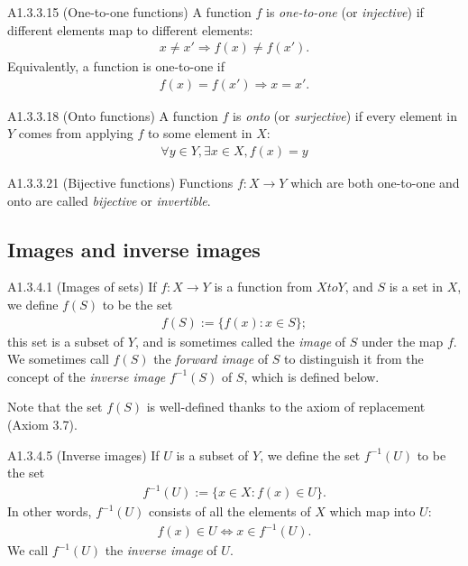 \begin{definition}{A1.3.3.15}
    (One-to-one functions) A function $f$ is \emph{one-to-one} (or \emph{injective}) if different elements map to
    different elements:
    \begin{align*}
        x\neq x' \Rightarrow f(x)\neq f(x').
    \end{align*}
    Equivalently, a function is one-to-one if
    \begin{align*}
        f(x)=f(x') \Rightarrow x=x'.
    \end{align*}
\end{definition}

\begin{definition}{A1.3.3.18}
    (Onto functions) A function $f$ is \emph{onto} (or \emph{surjective}) if every element in $Y$ comes from applying
    $f$ to some element in $X$:
    \begin{align*}
        \forall y\in Y, \exists x\in X, f(x)=y
    \end{align*}
\end{definition}

\begin{definition}{A1.3.3.21}
    (Bijective functions) Functions $f: X\rightarrow Y$ which are both one-to-one and onto are called \emph{bijective}
    or \emph{invertible}.
\end{definition}

\subsection{Images and inverse images}
\begin{definition}{A1.3.4.1}
    (Images of sets) If $f: X\rightarrow Y$ is a function from $X to Y$, and $S$ is a set in $X$, we define $f(S)$ to be
    the set
    \begin{align*}
        f(S) := \{f(x):x\in S\};
    \end{align*}
    this set is a subset of $Y$, and is sometimes called the \emph{image} of $S$ under the map $f$. We sometimes call
    $f(S)$ the \emph{forward image} of $S$ to distinguish it from the concept of the \emph{inverse image} $f^{-1}(S)$
    of $S$, which is defined below.

    Note that the set $f(S)$ is well-defined thanks to the axiom of replacement (Axiom 3.7).
\end{definition}

\begin{definition}{A1.3.4.5}
    (Inverse images) If $U$ is a subset of $Y$, we define the set $f^{-1}(U)$ to be the set
    \begin{align*}
        f^{-1}(U) := \{x\in X:f(x)\in U\}.
    \end{align*}
    In other words, $f^{-1}(U)$ consists of all the elements of $X$ which map into $U$:
    \begin{align*}
        f(x)\in U \iff x\in f^{-1}(U).
    \end{align*}
    We call $f^{-1}(U)$ the \emph{inverse image} of $U$.
\end{definition}

